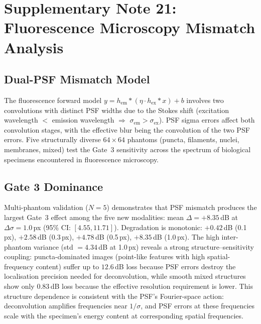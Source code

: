 \documentclass[11pt]{article}
\begin{document}
\section{Supplementary Note 21: Fluorescence Microscopy Mismatch Analysis}
\label{sec:note_fluorescence}

\subsection{Dual-PSF Mismatch Model}
The fluorescence forward model $y = h_{\mathrm{em}} * (\eta \cdot h_{\mathrm{ex}} * x) + b$ involves two convolutions with distinct PSF widths due to the Stokes shift (excitation wavelength $< $ emission wavelength $\Rightarrow$ $\sigma_{\mathrm{em}} > \sigma_{\mathrm{ex}}$). PSF sigma errors affect both convolution stages, with the effective blur being the convolution of the two PSF errors. Five structurally diverse $64 \times 64$ phantoms (puncta, filaments, nuclei, membranes, mixed) test the Gate~3 sensitivity across the spectrum of biological specimens encountered in fluorescence microscopy.

\subsection{Gate 3 Dominance}
Multi-phantom validation ($N{=}5$) demonstrates that PSF mismatch produces the largest Gate~3 effect among the five new modalities: mean $\Delta{=}+8.35$\,dB at $\Delta\sigma{=}1.0$\,px (95\% CI: $[4.55, 11.71]$). Degradation is monotonic: $+0.42$\,dB (0.1\,px), $+2.58$\,dB (0.3\,px), $+4.78$\,dB (0.5\,px), $+8.35$\,dB (1.0\,px).
The high inter-phantom variance (std $= 4.34$\,dB at 1.0\,px) reveals a strong structure--sensitivity coupling: puncta-dominated images (point-like features with high spatial-frequency content) suffer up to $12.6$\,dB loss because PSF errors destroy the localisation precision needed for deconvolution, while smooth mixed structures show only $0.83$\,dB loss because the effective resolution requirement is lower.
This structure dependence is consistent with the PSF's Fourier-space action: deconvolution amplifies frequencies near $1/\sigma$, and PSF errors at these frequencies scale with the specimen's energy content at corresponding spatial frequencies.
\end{document}

